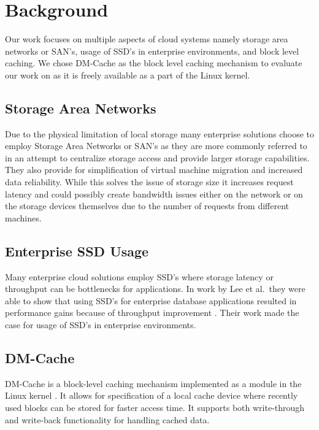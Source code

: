 \section{Background}

Our work focuses on multiple aspects of cloud systems namely storage
area networks or SAN's, usage of SSD's in enterprise environments, and
block level caching. We chose DM-Cache as the block level caching
mechanism to evaluate our work on as it is freely available as a part
of the Linux kernel.

\subsection{Storage Area Networks}

Due to the physical limitation of local storage many enterprise
solutions choose to employ Storage Area Networks or SAN's as they are
more commonly referred to in an attempt to centralize storage access
and provide larger storage capabilities. They also provide for
simplification of virtual machine migration and increased data
reliability. While this solves the issue of storage size it increases
request latency and could possibly create bandwidth issues either on
the network or on the storage devices themselves due to the number of
requests from different machines.

\subsection{Enterprise SSD Usage}

Many enterprise cloud solutions employ SSD's where storage latency or
throughput can be bottlenecks for applications. In work by Lee et al.\
they were able to show that using SSD's for enterprise database
applications resulted in performance gains because of throughput
improvement \cite{EnterpriseSSD}. Their work made the case for usage
of SSD's in enterprise environments.


\subsection{DM-Cache}

DM-Cache is a block-level caching mechanism implemented as a module in
the Linux kernel \cite{DM-Cache}. It allows for specification of a
local cache device where recently used blocks can be stored for faster
access time. It supports both write-through and write-back
functionality for handling cached data.

